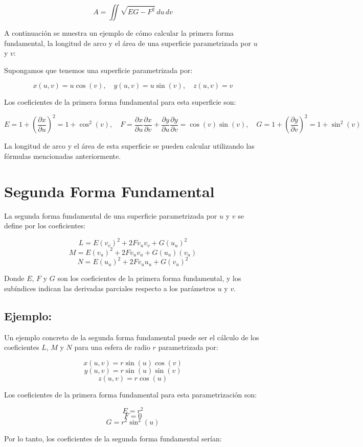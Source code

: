 \documentclass{article}
\begin{document}
	$$ A = \iint \sqrt{EG - F^2} \, du \, dv $$
	
	A continuación se muestra un ejemplo de cómo calcular la primera forma fundamental, la longitud de arco y el área de una superficie parametrizada por $u$ y $v$:
	
	Supongamos que tenemos una superficie parametrizada por:
	
	$$ x(u,v) = u \cos(v), \quad y(u,v) = u \sin(v), \quad z(u,v) = v $$
	
	Los coeficientes de la primera forma fundamental para esta superficie son:
	
	$$ E = 1 + (\frac{\partial x}{\partial u})^2 = 1 + \cos^2(v), \quad F = \frac{\partial x}{\partial u} \frac{\partial x}{\partial v} + \frac{\partial y}{\partial u} \frac{\partial y}{\partial v} = \cos(v) \sin(v), \quad G = 1 + (\frac{\partial y}{\partial v})^2 = 1 + \sin^2(v) $$
	
	La longitud de arco y el área de esta superficie se pueden calcular utilizando las fórmulas mencionadas anteriormente.
	
	\section{Segunda Forma Fundamental}
	La segunda forma fundamental de una superficie parametrizada por $u$ y $v$ se define por los coeficientes:
	
	$$ L = E(v_v)^2 + 2Fv_uv_v + G(u_u)^2 $$
	$$ M = E(v_u)^2 + 2Fv_uv_u + G(u_u)(v_u) $$
	$$ N = E(u_u)^2 + 2Fv_uu_u + G(v_u)^2 $$
	
	Donde $E$, $F$ y $G$ son los coeficientes de la primera forma fundamental, y los subíndices indican las derivadas parciales respecto a los parámetros $u$ y $v$.
	
	\subsection{Ejemplo:}
	Un ejemplo concreto de la segunda forma fundamental puede ser el cálculo de los coeficientes $L$, $M$ y $N$ para una esfera de radio $r$ parametrizada por:
	
	$$ x(u, v) = r \sin(u) \cos(v) $$
	$$ y(u, v) = r \sin(u) \sin(v) $$
	$$ z(u, v) = r \cos(u) $$
	
	Los coeficientes de la primera forma fundamental para esta parametrización son:
	
	$$ E = r^2 $$
	$$ F = 0 $$
	$$ G = r^2 \sin^2(u) $$
	
	Por lo tanto, los coeficientes de la segunda forma fundamental serían:
	
\end{document}

